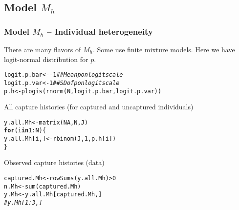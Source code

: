 \documentclass[color=usenames,dvipsnames]{beamer}\usepackage[]{graphicx}\usepackage[]{color}
\makeatletter
\newcommand{\hlnum}[1]{\textcolor[rgb]{0.69,0.494,0}{#1}}%
\newcommand{\hlcom}[1]{\textcolor[rgb]{0.514,0.506,0.514}{\textit{#1}}}%
\newcommand{\hlopt}[1]{\textcolor[rgb]{0,0,0}{#1}}%
\newcommand{\hlstd}[1]{\textcolor[rgb]{0,0,0}{#1}}%
\newcommand{\hlkwa}[1]{\textcolor[rgb]{0,0,0}{\textbf{#1}}}%
\newcommand{\hlkwb}[1]{\textcolor[rgb]{0,0.341,0.682}{#1}}%
\newcommand{\hlkwd}[1]{\textcolor[rgb]{0.004,0.004,0.506}{#1}}%
\newenvironment{kframe}{%
 \def\at@end@of@kframe{}%
 \ifinner\ifhmode%
  \def\at@end@of@kframe{\end{minipage}}%
  \begin{minipage}{\columnwidth}%
 \fi\fi%
 \def\FrameCommand##1{\hskip\@totalleftmargin \hskip-\fboxsep
 \colorbox{shadecolor}{##1}\hskip-\fboxsep
     \hskip-\linewidth \hskip-\@totalleftmargin \hskip\columnwidth}%
 \MakeFramed {\advance\hsize-\width
   \@totalleftmargin\z@ \linewidth\hsize
   \@setminipage}}%
 {\par\unskip\endMakeFramed%
 \at@end@of@kframe}
\newenvironment{knitrout}{}{} %
\makeatother
\begin{document}
\subsection{Model $M_h$}


\begin{frame}[fragile]
  \frametitle{Model $M_h$ -- Individual heterogeneity}
  There are many flavors of $M_h$. Some use finite mixture
  models. Here we have logit-normal distribution for $p$. 
\begin{knitrout}\scriptsize
{}\color{fgcolor}\begin{kframe}
\begin{alltt}
\hlstd{logit.p.bar} \hlkwb{<-} \hlopt{-}\hlnum{1}  \hlcom{## Mean p on logit scale}
\hlstd{logit.p.var} \hlkwb{<-} \hlnum{1}   \hlcom{## SD of p on logit scale}
\hlstd{p.h} \hlkwb{<-} \hlkwd{plogis}\hlstd{(}\hlkwd{rnorm}\hlstd{(N, logit.p.bar, logit.p.var))}
\end{alltt}
\end{kframe}
\end{knitrout}
  \pause
  \vfill
  All capture histories (for captured and uncaptured individuals)
  \vspace{-6pt}
\begin{knitrout}\scriptsize
{}\color{fgcolor}\begin{kframe}
\begin{alltt}
\hlstd{y.all.Mh} \hlkwb{<-} \hlkwd{matrix}\hlstd{(}\hlnum{NA}\hlstd{, N, J)}
\hlkwa{for}\hlstd{(i} \hlkwa{in} \hlnum{1}\hlopt{:}\hlstd{N) \{}
    \hlstd{y.all.Mh[i,]} \hlkwb{<-} \hlkwd{rbinom}\hlstd{(J,} \hlnum{1}\hlstd{, p.h[i])}
\hlstd{\}}
\end{alltt}
\end{kframe}
\end{knitrout}
  \pause
  \vfill
  Observed capture histories (data)
  \vspace{-6pt}
\begin{knitrout}\scriptsize
{}\color{fgcolor}\begin{kframe}
\begin{alltt}
\hlstd{captured.Mh} \hlkwb{<-} \hlkwd{rowSums}\hlstd{(y.all.Mh)}\hlopt{>}\hlnum{0}
\hlstd{n.Mh} \hlkwb{<-} \hlkwd{sum}\hlstd{(captured.Mh)}
\hlstd{y.Mh} \hlkwb{<-} \hlstd{y.all.Mh[captured.Mh,]}
\hlcom{#y.Mh[1:3,]}
\end{alltt}
\end{kframe}
\end{knitrout}
\end{frame}
\end{document}
